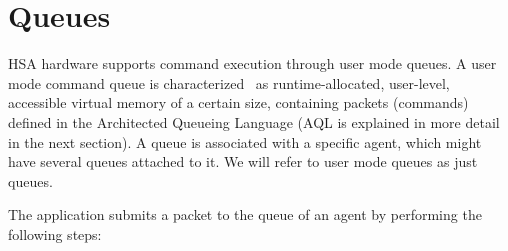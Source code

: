 \documentclass[final]{book}
\begin{document}


\section{Queues} \label{sec:queues}

HSA hardware supports command execution through user mode queues. A user mode
command queue is characterized~\cite{sar} as runtime-allocated, user-level,
accessible virtual memory of a certain size, containing packets (commands)
defined in the Architected Queueing Language (AQL is explained in more detail in
the next section). A queue is associated with a specific agent, which might have
several queues attached to it. We will refer to user mode queues as just queues.

The application submits a packet to the queue of an agent by performing the
following steps:
\end{document}
